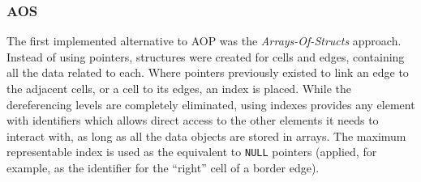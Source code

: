 \subsubsection{AOS}


The first implemented alternative to AOP was the \textit{Arrays-Of-Structs} approach.
Instead of using pointers, structures were created for cells and edges, containing all the data related to each.
Where pointers previously existed to link an edge to the adjacent cells, or a cell to its edges, an index is placed.
While the dereferencing levels are completely eliminated, using indexes provides any element with identifiers which allows direct access to the other elements it needs to interact with, as long as all the data objects are stored in arrays.
The maximum representable index is used as the equivalent to \texttt{NULL} pointers (applied, for example, as the identifier for the ``right'' cell of a border edge).